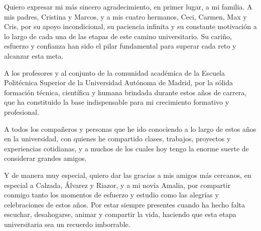 Quiero expresar mi más sincero agradecimiento, en primer lugar, a mi familia. A mis padres, Cristina y Marcos, y a mis cuatro hermanos, Ceci, Carmen, Max y Cris, por su apoyo incondicional, su paciencia infinita y su constante motivación a lo largo de cada una de las etapas de este camino universitario. Su cariño, esfuerzo y confianza han sido el pilar fundamental para superar cada reto y alcanzar esta meta.

A los profesores y al conjunto de la comunidad académica de la Escuela Politécnica Superior de la Universidad Autónoma de Madrid, por la sólida formación técnica, científica y humana brindada durante estos años de carrera, que ha constituido la base indispensable para mi crecimiento formativo y profesional.

A todos los compañeros y personas que he ido conociendo a lo largo de estos años en la universidad, con quienes he compartido clases, trabajos, proyectos y experiencias cotidianas, y a muchos de los cuales hoy tengo la enorme suerte de considerar grandes amigos.

Y de manera muy especial, quiero dar las gracias a mis amigos más cercanos, en especial a Calzada, Álvarez y Riazor, y a mi novia Amalia, por compartir conmigo tanto los momentos de esfuerzo y estudio como las alegrías y celebraciones de estos años. Por estar siempre presentes cuando ha hecho falta escuchar, desahogarse, animar y compartir la vida, haciendo que esta etapa universitaria sea un recuerdo imborrable.